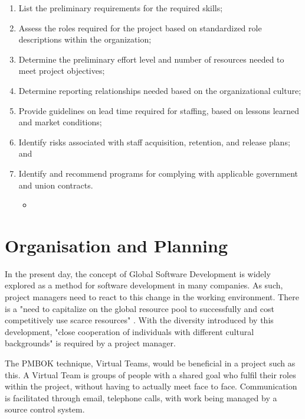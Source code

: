 \begin{enumerate}
\item List the preliminary requirements for the required skills; 
\item Assess the roles required for the project based on standardized role descriptions within the organization;
\item Determine the preliminary effort level and number of resources needed to meet project objectives;
\item Determine reporting relationships needed based on the organizational culture;
\item Provide guidelines on lead time required for staffing, based on lessons learned and market conditions;
\item Identify risks associated with staff acquisition, retention, and release plans; and
\item Identify and recommend programs for complying with applicable government and union contracts.
\begin{itemize}
\item \parencite{pmbok}
\end{itemize}
\end{enumerate}

\section{Organisation and Planning}

In the present day, the concept of Global Software Development is widely explored as a method for software development in many companies. As such, project managers need to react to this change in the working environment. There is a "need to capitalize on the global resource pool to successfully and cost competitively use scarce resources" \parencite{gsd}. With the diversity introduced by this development, "close cooperation of individuals with different cultural backgrounds" \parencite{gsd} is required by a project manager.

The PMBOK technique, Virtual Teams, would be beneficial in a project such as this. A Virtual Team is groups of people with a shared goal who fulfil their roles within the project, without having to actually meet face to face. Communication is facilitated through email, telephone calls, with work being managed by a source control system.



